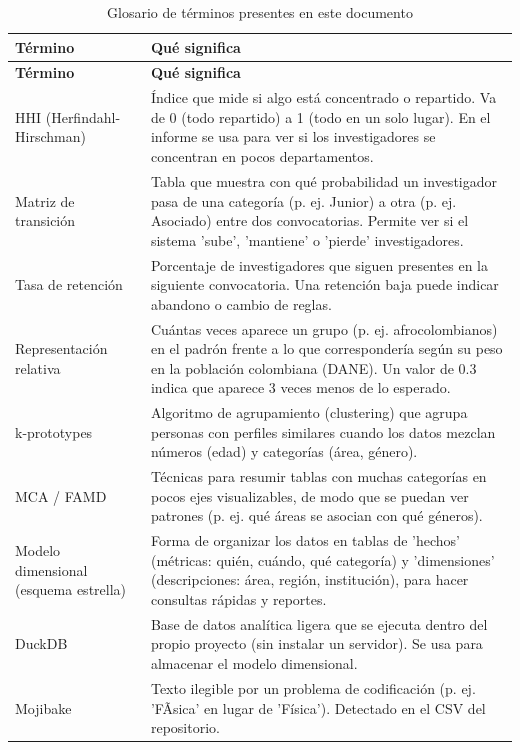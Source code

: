 \begingroup
\small
\setlength{\tabcolsep}{3pt}
\begin{longtable}{>{\raggedright\arraybackslash}p{4.3cm}>{\raggedright\arraybackslash}p{9.8cm}}
\caption{Glosario de términos presentes en este documento}
\label{tab:glosario}\\
\toprule
\textbf{Término} & \textbf{Qué significa} \\
\midrule
\endfirsthead
\toprule
\textbf{Término} & \textbf{Qué significa} \\
\midrule
\endhead
    HHI (Herfindahl-Hirschman) & Índice que mide si algo está concentrado o repartido. Va de 0 (todo repartido) a 1 (todo en un solo lugar). En el informe se usa para ver si los investigadores se concentran en pocos departamentos.
 \\
    Matriz de transición & Tabla que muestra con qué probabilidad un investigador pasa de una categoría (p. ej. Junior) a otra (p. ej. Asociado) entre dos convocatorias. Permite ver si el sistema 'sube', 'mantiene' o 'pierde' investigadores.
 \\
    Tasa de retención & Porcentaje de investigadores que siguen presentes en la siguiente convocatoria. Una retención baja puede indicar abandono o cambio de reglas.
 \\
    Representación relativa & Cuántas veces aparece un grupo (p. ej. afrocolombianos) en el padrón frente a lo que correspondería según su peso en la población colombiana (DANE). Un valor de 0.3 indica que aparece 3 veces menos de lo esperado.
 \\
    k-prototypes & Algoritmo de agrupamiento (clustering) que agrupa personas con perfiles similares cuando los datos mezclan números (edad) y categorías (área, género).
 \\
    MCA / FAMD & Técnicas para resumir tablas con muchas categorías en pocos ejes visualizables, de modo que se puedan ver patrones (p. ej. qué áreas se asocian con qué géneros).
 \\
    Modelo dimensional (esquema estrella) & Forma de organizar los datos en tablas de 'hechos' (métricas: quién, cuándo, qué categoría) y 'dimensiones' (descripciones: área, región, institución), para hacer consultas rápidas y reportes.
 \\
    DuckDB & Base de datos analítica ligera que se ejecuta dentro del propio proyecto (sin instalar un servidor). Se usa para almacenar el modelo dimensional.
 \\
    Mojibake & Texto ilegible por un problema de codificación (p. ej. 'FÃ­sica' en lugar de 'Física'). Detectado en el CSV del repositorio.

\end{longtable}
